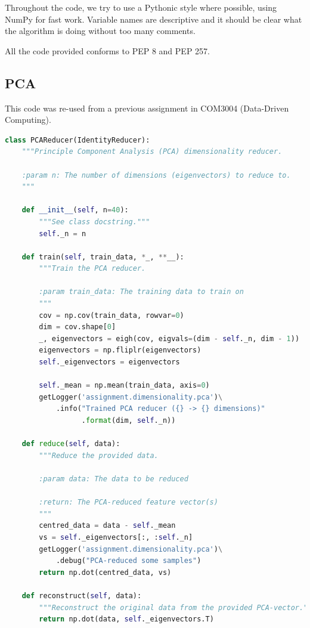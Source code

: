 \documentclass[a4paper, 11pt, twocolumn, final]{article} %
\begin{document}
Throughout the code, we try to use a Pythonic style where possible, using NumPy
for fast work. Variable names are descriptive and it should be clear what the
algorithm is doing without too many comments.

All the code provided conforms to PEP 8 and PEP 257.

\subsection{PCA} This code was re-used from a previous assignment in COM3004
(Data-Driven Computing).

\begin{lstlisting}[language=Python, style=python]
class PCAReducer(IdentityReducer):
    """Principle Component Analysis (PCA) dimensionality reducer.

    :param n: The number of dimensions (eigenvectors) to reduce to.
    """

    def __init__(self, n=40):
        """See class docstring."""
        self._n = n

    def train(self, train_data, *_, **__):
        """Train the PCA reducer.

        :param train_data: The training data to train on
        """
        cov = np.cov(train_data, rowvar=0)
        dim = cov.shape[0]
        _, eigenvectors = eigh(cov, eigvals=(dim - self._n, dim - 1))
        eigenvectors = np.fliplr(eigenvectors)
        self._eigenvectors = eigenvectors

        self._mean = np.mean(train_data, axis=0)
        getLogger('assignment.dimensionality.pca')\
            .info("Trained PCA reducer ({} -> {} dimensions)"
                  .format(dim, self._n))

    def reduce(self, data):
        """Reduce the provided data.

        :param data: The data to be reduced

        :return: The PCA-reduced feature vector(s)
        """
        centred_data = data - self._mean
        vs = self._eigenvectors[:, :self._n]
        getLogger('assignment.dimensionality.pca')\
            .debug("PCA-reduced some samples")
        return np.dot(centred_data, vs)

    def reconstruct(self, data):
        """Reconstruct the original data from the provided PCA-vector."""
        return np.dot(data, self._eigenvectors.T)

\end{lstlisting}
\end{document}
